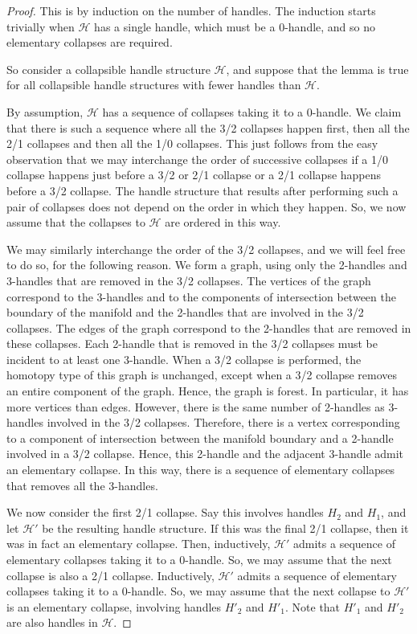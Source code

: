\documentclass[oneside]{amsart}
\numberwithin{equation}{section}
\theoremstyle{plain}
\theoremstyle{definition}
\newcommand{\calH}{\mathcal{H}}
\begin{document}
\begin{proof}
This is by induction on the number of handles. The induction starts trivially when $\calH$ has a single handle,
which must be a 0-handle, and so no elementary collapses are required.

So consider a collapsible handle structure $\calH$, and suppose that the lemma is true for all collapsible 
handle structures with fewer handles than $\calH$.

By assumption, $\calH$ has a sequence of collapses taking it to a 0-handle. We claim that there is such
a sequence where all the 3/2 collapses happen first, then all the 2/1 collapses and then all the 1/0 collapses.
This just follows from the easy observation that we may interchange the order of successive collapses
if a 1/0 collapse happens just before a 3/2 or 2/1 collapse or a 2/1 collapse happens before a 3/2 collapse.
The handle structure that results after performing such a pair of collapses does not depend on the
order in which they happen. So, we now assume that the collapses to $\calH$ are ordered in this way.

We may similarly interchange the order of the 3/2 collapses, and we will feel free to do so, for the following reason. We form
a graph, using only the 2-handles and 3-handles that are removed in the 3/2 collapses.
The vertices of the graph correspond to the 3-handles and to the components of intersection between the
boundary of the manifold and the 2-handles that are involved in the 3/2 collapses. The edges of the graph
correspond to the 2-handles that are removed in these collapses. Each 2-handle that is removed in 
the 3/2 collapses must be incident to at least one 3-handle. When a 3/2 collapse is performed,
the homotopy type of this graph is unchanged, except when a 3/2 collapse removes an entire
component of the graph. Hence, the graph is forest. In particular, it has more vertices than edges.
However, there is the same number of 2-handles as 3-handles involved in the 3/2 collapses.
Therefore, there is a vertex corresponding to a component of intersection between the manifold boundary
and a 2-handle involved in a 3/2 collapse.
Hence, this 2-handle and the adjacent 3-handle admit an elementary
collapse. In this way, there is a sequence of elementary collapses that removes all the 3-handles.

We now consider the first 2/1 collapse. Say this involves handles $H_2$ and $H_1$, and let
$\calH'$ be the resulting handle structure. If this was the final 2/1 collapse, then it was in fact
an elementary collapse. Then, inductively, $\calH'$ admits a sequence of elementary collapses
taking it to a 0-handle. So, we may assume that the next collapse is also a 2/1 collapse.
Inductively, $\calH'$ admits a sequence of elementary collapses taking it to a 0-handle.
So, we may assume that the next collapse to $\calH'$ is an elementary collapse, involving
handles $H'_2$ and $H'_1$. Note that $H'_1$ and $H'_2$ are also handles in $\calH$.


\end{proof}
\end{document}

